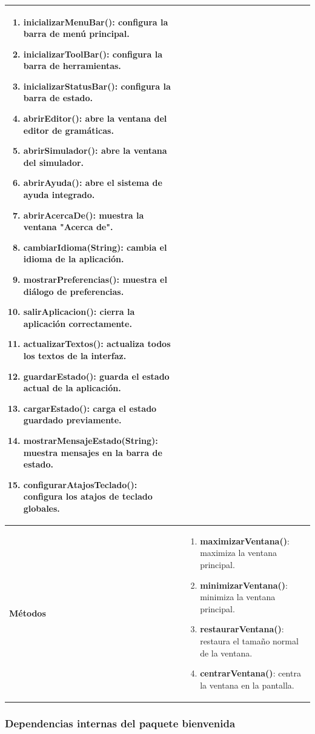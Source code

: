 \begin{longtable}[H]{|>{\columncolor[rgb]{0.63,0.79,0.95}}m{6cm} | m{8.5cm} |}
\begin{enumerate}
    \item \textbf{inicializarMenuBar()}: configura la barra de menú principal.
    \item \textbf{inicializarToolBar()}: configura la barra de herramientas.
    \item \textbf{inicializarStatusBar()}: configura la barra de estado.
    \item \textbf{abrirEditor()}: abre la ventana del editor de gramáticas.
    \item \textbf{abrirSimulador()}: abre la ventana del simulador.
    \item \textbf{abrirAyuda()}: abre el sistema de ayuda integrado.
    \item \textbf{abrirAcercaDe()}: muestra la ventana "Acerca de".
    \item \textbf{cambiarIdioma(String)}: cambia el idioma de la aplicación.
    \item \textbf{mostrarPreferencias()}: muestra el diálogo de preferencias.
    \item \textbf{salirAplicacion()}: cierra la aplicación correctamente.
    \item \textbf{actualizarTextos()}: actualiza todos los textos de la interfaz.
    \item \textbf{guardarEstado()}: guarda el estado actual de la aplicación.
    \item \textbf{cargarEstado()}: carga el estado guardado previamente.
    \item \textbf{mostrarMensajeEstado(String)}: muestra mensajes en la barra de estado.
    \item \textbf{configurarAtajosTeclado()}: configura los atajos de teclado globales.
\end{enumerate} \\ \hline
\textbf{Métodos} &
\begin{enumerate}
    \item \textbf{maximizarVentana()}: maximiza la ventana principal.
    \item \textbf{minimizarVentana()}: minimiza la ventana principal.
    \item \textbf{restaurarVentana()}: restaura el tamaño normal de la ventana.
    \item \textbf{centrarVentana()}: centra la ventana en la pantalla.
\end{enumerate}
\label{tabla_menu_principal}
\end{longtable}

\subsubsection{Dependencias internas del paquete bienvenida}

